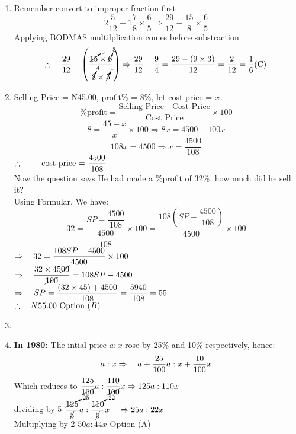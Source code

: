 \begin{multicols}{2}
\begin{enumerate}[label={\arabic*.}]
    \item Remember convert to improper fraction first
    \[2\frac{5}{12} - 1\frac{7}{8} \times \frac{6}{5} \Rightarrow \frac{29}{12} - \frac{15}{8} \times \frac{6}{5}\]
    Applying BODMAS multilplication comes before substraction\\
    \[\therefore \hspace{10px} \dfrac{29}{12} - \left(\dfrac{\cancelto{3}{15} \times \cancelto{3}{6}}{\cancelto{4}{8} \times \cancelto{1}{5}}\right) \Rightarrow \dfrac{29}{12} - \dfrac{9}{4} = \dfrac{29 - (9 \times 3)}{12} = \frac{2}{12} = \frac{1}{6} \text{(C)}\]

    \item Selling Price = N45.00, profit\% = 8\%, let cost price = \(x\)
    \[ \%\text{profit} = \frac{\text{Selling Price - Cost Price} }{\text{Cost Price}} \times 100 \]
       \[8 = \frac{45 - x }{x} \times 100 \Rightarrow 8x = 4500 -100x\]
       \[108x = 4500 \Rightarrow x = \dfrac{4500}{108}  \]
       \(\therefore \hspace{20px} \text{ cost price = }\dfrac{4500}{108}\) \\
       Now the question says He had made a \%profit of 32\%, how much did he sell it? \\
       Using Formular, We have: 
       \[32 = \frac{SP - \dfrac{4500}{108}}{\dfrac{4500}{108}} \times 100 =  \frac{108\left(SP - \dfrac{4500}{108}\right)}{4500} \times 100\]
       \(\Rightarrow \hspace {10px} 32 =  \dfrac{108SP - 4500}{4500} \times 100 \) \\
       \(\Rightarrow \hspace{10px} \dfrac{32 \times 45\cancel{00}}{\cancel{100}} = 108SP - 4500\) \\
       \(\Rightarrow  \hspace{10px} SP = \dfrac{\left(32 \times 45\right) + 4500}{108} = \dfrac{5940}{108} = 55\) \vspace{5px}\\
       \(\therefore \hspace{10px} N55.00 \text{ Option } (B)\)

    \item 

    \item \textbf{In 1980:} The intial price \(a : x\) rose by 25\% and 10\% respectively, hence:
    \[a:x \Rightarrow \hspace{10px} a + \dfrac{25}{100}a : x + \dfrac{10}{100}x\]
    Which reduces to \(\dfrac{125}{\cancel{100}}a : \dfrac{110}{\cancel{100}}x \Rightarrow {125}a : 110x  \) \vspace{5px} \\
    dividing by 5 \(\dfrac{\cancelto{25}{125}}{\cancel{5}} a : \dfrac{\cancelto{22}{110}}{\cancel{5}} x \hspace {10px}\Rightarrow 25a : 22x \) \vspace{5px}\\
    Multiplying by 2 \hspace{10px} \(50a : 44x\) \hspace{5px}Option (A)
    \[\]


\end{enumerate}
\end{multicols}
